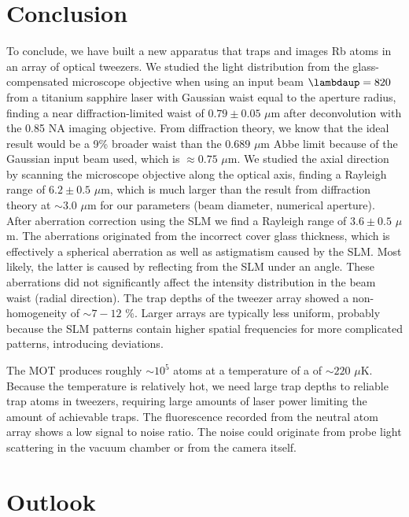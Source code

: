 \section{Conclusion}

To conclude, we have built a new apparatus that traps and images Rb atoms in an array of optical tweezers. 
We studied the light distribution from the glass-compensated microscope objective when using an input beam $\lambdaup = 820$ from a titanium sapphire laser with Gaussian waist equal to the aperture radius, finding a near diffraction-limited waist of $0.79 \pm 0.05$ $\mu$m after deconvolution with the 0.85 NA imaging objective. 
From diffraction theory, we know that the ideal result would be a 9\% broader waist than the $0.689$ $\mu$m Abbe limit because of the Gaussian input beam used, which is $\approx 0.75$ $\mu$m.
We studied the axial direction by scanning the microscope objective along the optical axis, finding a Rayleigh range of $6.2\pm0.5$ $\mu$m, which is much larger than the result from diffraction theory at $\sim 3.0$ $\mu$m for our parameters (beam diameter, numerical aperture). 
After aberration correction using the SLM we find a Rayleigh range of $3.6 \pm 0.5$ $\mu$m.
The aberrations originated from the incorrect cover glass thickness, which is effectively a spherical aberration as well as astigmatism caused by the SLM.
Most likely, the latter is caused by reflecting from the SLM under an angle.
These aberrations did not significantly affect the intensity distribution in the beam waist (radial direction).
The trap depths of the tweezer array showed a non-homogeneity of $\sim 7-12$ \%.
Larger arrays are typically less uniform, probably because the SLM patterns contain higher spatial frequencies for more complicated patterns, introducing deviations. 

The MOT produces roughly $\sim10^5$ atoms at a temperature of a of $\sim220$ $\mu$K.
Because the temperature is relatively hot, we need large trap depths to reliable trap atoms in tweezers, requiring large amounts of laser power limiting the amount of achievable traps. 
The fluorescence recorded from the neutral atom array shows a low signal to noise ratio.
The noise could originate from probe light scattering in the vacuum chamber or from the camera itself. 


\section{Outlook}


